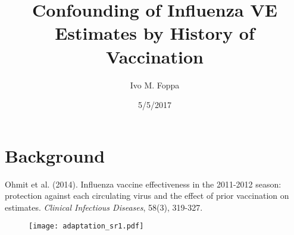 \documentclass{beamer}
\title[TND] %
{Confounding of Influenza VE Estimates by History of Vaccination}
\author{Ivo M. Foppa}
\date %
{5/5/2017}
\begin{document}
\begin{frame}
  \titlepage
\end{frame}
\section{Background}
%
\begin{frame}
	
	{\small Ohmit et al. (2014). Influenza vaccine effectiveness in the 2011-2012 season: protection against each circulating virus and the effect of prior vaccination on estimates. \emph{Clinical Infectious Diseases}, 58(3), 319-327.}
	\begin{figure}
		\texttt{[image: adaptation\_sr1.pdf]}
	\end{figure}
\end{frame}
%
%	
\end{document}
